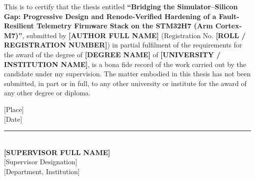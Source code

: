 
This is to certify that the thesis entitled \textbf{``Bridging the Simulator--Silicon Gap: Progressive Design and Renode-Verified Hardening of a Fault-Resilient Telemetry Firmware Stack on the STM32H7 (Arm Cortex-M7)''}, submitted by \textbf{[AUTHOR FULL NAME]} (Registration No. \textbf{[ROLL / REGISTRATION NUMBER]}) in partial fulfilment of the requirements for the award of the degree of \textbf{[DEGREE NAME]} of \textbf{[UNIVERSITY / INSTITUTION NAME]}, is a bona fide record of the work carried out by the candidate under my supervision. The matter embodied in this thesis has not been submitted, in part or in full, to any other university or institute for the award of any other degree or diploma.

\vspace{2.2cm}
\noindent
\begin{minipage}[t]{0.45\textwidth}
[Place] \\{}
[Date]
\end{minipage}%
\begin{minipage}[t]{0.45\textwidth}
\raggedleft
\rule{6cm}{0.4pt}\\
\textbf{[SUPERVISOR FULL NAME]} \\{}
[Supervisor Designation] \\{}
[Department, Institution]
\end{minipage}
